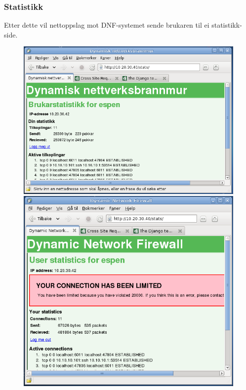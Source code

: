 \documentclass[nynorsk,14pt]{beamer}
\begin{document}
\begin{frame}
	\frametitle{Statistikk}
	\small{Etter dette vil nettoppslag mot DNF-systemet sende brukaren til ei statistikk-side.}
	\begin{figure}
		\includegraphics[scale=0.22]{imgs/user_stats.png} 
		\includegraphics[scale=0.2]{imgs/user_stats_restricted.png}	
	\end{figure}
\end{frame}
\end{document}
